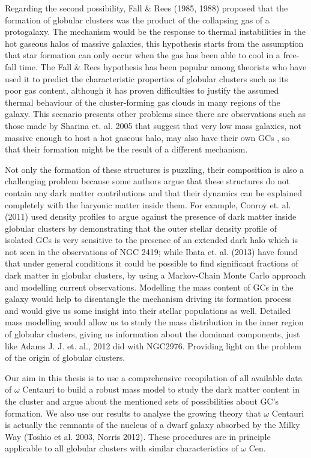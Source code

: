 Regarding the second possibility, Fall \& Rees (1985, 1988) proposed that the formation of globular clusters was the product of the collapsing gas of a protogalaxy. The mechanism would be the response to thermal instabilities in the hot gaseous halos of massive galaxies, this hypothesis starts from the assumption that star formation can only occur when the gas has been able to cool in a free-fall time. The Fall \& Rees hypothesis has been popular among theorists who have used it to predict the characteristic properties of globular clusters such as its poor gas content, although it has proven difficulties to justify the assumed thermal behaviour of the cluster-forming gas clouds in many regions of the galaxy. This scenario presents other problems since there are observations such as those made by Sharina et. al. 2005 that suggest that very low mass galaxies, not massive enough to host a hot gaseous halo, may also have their own GCs , so that their formation might be the result of a different mechanism.

Not only the formation of these structures is puzzling, their composition is also a challenging problem because some authors argue that these structures do not contain any dark matter contributions and that their dynamics can be explained completely with the baryonic matter inside them. For example, Conroy et. al. (2011) used density profiles to argue against the presence of dark matter inside globular clusters by demonstrating that the outer stellar density profile of isolated GCs is
very sensitive to the presence of an extended dark halo which is not seen in the observations of NGC 2419; while Ibata et. al. (2013) have found that under general conditions it could be possible to find significant fractions of dark matter in globular clusters, by using a Markov-Chain Monte Carlo approach and modelling current observations. Modelling the mass content of GCs in the galaxy would help to disentangle the mechanism driving its formation process and would give us some insight into their stellar populations as well. Detailed mass modelling would allow us to study the mass distribution in the inner region of globular clusters, giving us information about the dominant components, just like Adams J. J. et. al., 2012 did with NGC2976. Providing light on the problem of the origin of globular clusters.

Our aim in this thesis is to use a comprehensive recopilation of all available data of $\omega$ Centauri to build a robust mass model to study the dark matter content in the cluster and argue about the mentioned sets of possibilities about GC's formation. We also use our results to analyse the growing theory that $\omega$ Centauri is actually the remnants of the nucleus of a dwarf galaxy absorbed by the Milky Way (Toshio et al. 2003, Norris 2012). These procedures are in principle applicable to all globular clusters with similar characteristics of $\omega$ Cen. 

